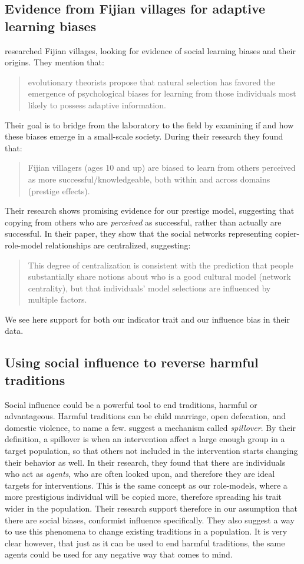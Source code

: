 \documentclass[11pt]{article}
\begin{document}
\subsection{Evidence from Fijian villages for adaptive learning biases \citep{fijian_social_bias}}
\citet{fijian_social_bias} researched Fijian villages, looking for evidence of social learning biases and their origins. They mention that:
\begin{quote}
evolutionary theorists propose that natural selection has favored the emergence of psychological biases for learning from those individuals most likely to possess adaptive information.
\end{quote}
Their goal is to bridge from the laboratory to the field by examining if and how these biases emerge in a small-scale society.
During their research they found that:
\begin{quote}
Fijian villagers (ages 10 and up) are biased to learn from others perceived as more successful/knowledgeable, both within and across domains (prestige effects).
\end{quote}
Their research shows promising evidence for our prestige model, suggesting that copying from others who are \textit{perceived} as successful, rather than actually are successful. In their paper, they show that the social networks representing copier-role-model relationships are centralized, suggesting:
\begin{quote}
This degree of centralization is consistent with the prediction that people substantially share notions about who is a good cultural model (network centrality), but that individuals’ model selections are influenced by multiple factors.
\end{quote}
We see here support for both our indicator trait and our influence bias in their data.


\subsection{Using social influence to reverse harmful traditions \citep{harmful_traditions}}
Social influence could be a powerful tool to end traditions, harmful or advantageous. Harmful traditions can be child marriage, open defecation, and domestic violence, to name a few. 
\citet{harmful_traditions} suggest a mechanism called \textit{spillover}. By their definition, a spillover is when an intervention affect a large enough group in a target population, so that others not included in the intervention starts changing their behavior as well. In their research, they found that there are individuals who act as \textit{agents}, who are often looked upon, and therefore they are ideal targets for interventions. This is the same concept as our role-models, where a more prestigious individual will be copied more, therefore spreading his trait wider in the population. Their research support therefore in our assumption that there are social biases, conformist influence specifically. They also suggest a way to use this phenomena to change existing traditions in a population. It is very clear however, that just as it can be used to end harmful traditions, the same agents could be used for any negative way that comes to mind.
\end{document}
